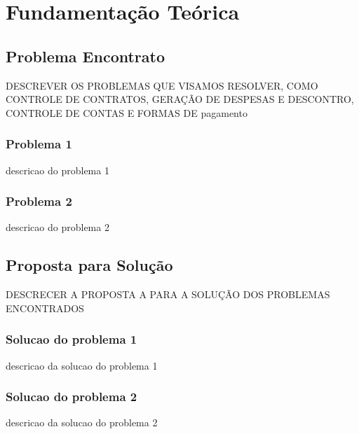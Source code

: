 \documentclass[../main.tex]{subfiles}
\begin{document}
\section{Fundamentação Teórica}    
\subsection{Problema Encontrato}
DESCREVER OS PROBLEMAS QUE VISAMOS RESOLVER, COMO CONTROLE DE CONTRATOS, GERAÇÃO DE DESPESAS E DESCONTRO, CONTROLE DE CONTAS E FORMAS DE pagamento
\subsubsection{Problema 1}
descricao do problema 1
\subsubsection{Problema 2}
descricao do problema 2
\subsection{Proposta para Solução}
DESCRECER A PROPOSTA A PARA A SOLUÇÃO DOS PROBLEMAS ENCONTRADOS
\subsubsection{Solucao do problema 1}
descricao da solucao do problema 1
\subsubsection{Solucao do problema 2}
descricao da solucao do problema 2

\end{document}
